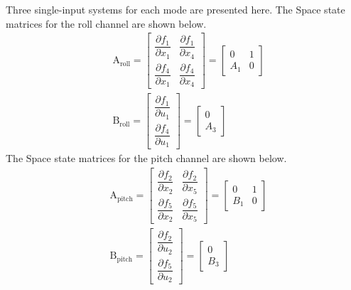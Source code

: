 \documentclass[conference]{IEEEtran}
\begin{document}
Three single-input systems for each mode are presented here. The Space state matrices for the roll channel are shown below.
\begin{equation}
	\begin{split}
		&\boldsymbol{\mathrm{A}}_{\text{roll}} = \begin{bmatrix}
			\dfrac{\partial  f_1}{\partial  x_1}& \dfrac{\partial  f_1}{\partial  x_4}
			\\[1em]
			\dfrac{\partial  f_4}{\partial  x_1}& \dfrac{\partial  f_4}{\partial  x_4}
		\end{bmatrix} = 
		\begin{bmatrix}
			0 & 1\\
			A_1 & 0
		\end{bmatrix} \\[1em]
		&\boldsymbol{\mathrm{B}}_{\text{roll}}  = \begin{bmatrix}
			\dfrac{\partial  f_1}{\partial  u_1}
			\\[1em]
			\dfrac{\partial  f_4}{\partial  u_1}
		\end{bmatrix} = 
		\begin{bmatrix}
			0\\
			A_3
		\end{bmatrix}
	\end{split}
\end{equation}
The Space state matrices for the pitch channel are shown below.
\begin{equation}
	\begin{split}
		&\boldsymbol{\mathrm{A}}_{\text{pitch}}  = \begin{bmatrix}
			\dfrac{\partial  f_2}{\partial  x_2}& \dfrac{\partial  f_2}{\partial  x_5}
			\\[1em]
			\dfrac{\partial  f_5}{\partial  x_2}& \dfrac{\partial  f_5}{\partial  x_5}
		\end{bmatrix} = 
		\begin{bmatrix}
			0 & 1\\
			B_1 & 0
		\end{bmatrix}\\[1em]
		&\boldsymbol{\mathrm{B}}_{\text{pitch}}  = \begin{bmatrix}
			\dfrac{\partial  f_2}{\partial  u_2}
			\\[1em]
			\dfrac{\partial  f_5}{\partial  u_2}
		\end{bmatrix} = 
		\begin{bmatrix}
			0\\
			B_3
		\end{bmatrix}
	\end{split}
\end{equation}
\end{document}
